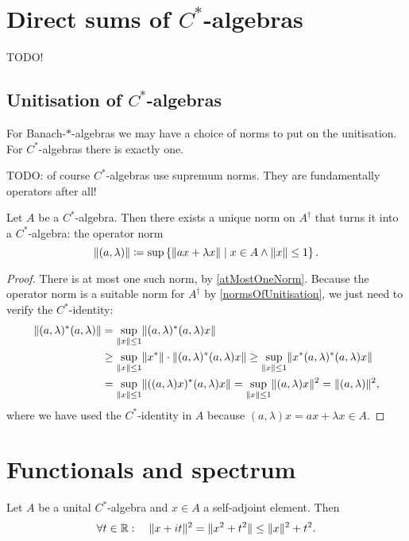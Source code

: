 \section{Direct sums of $C^*$-algebras}
TODO!

\subsection{Unitisation of $C^*$-algebras}
For Banach-$*$-algebras we may have a choice of norms to put on the unitisation. For $C^*$-algebras there is exactly one.

TODO: of course $C^*$-algebras use supremum norms. They are fundamentally operators after all!
\begin{proposition}
Let $A$ be a $C^*$-algebra. Then there exists a unique norm on $A^\dagger$ that turns it into a $C^*$-algebra: the operator norm
\[ \lVert(a,\lambda)\rVert \coloneqq \sup\left\{ \lVert ax + \lambda x\rVert \;\middle|\; x\in A \land \lVert x\rVert\leq 1 \right\} .\]
\end{proposition}
\begin{proof}
There is at most one such norm, by \ref{atMostOneNorm}. Because the operator norm is a suitable norm for $A^\dagger$ by \ref{normsOfUnitisation}, we just need to verify the $C^*$-identity:
\begin{align*}
\lVert(a,\lambda)^*(a,\lambda)\rVert &= \sup_{\lVert x\rVert\leq 1} \lVert(a,\lambda)^*(a,\lambda)x\rVert \\
&\geq \sup_{\lVert x\rVert\leq 1} \lVert x^*\rVert\cdot\lVert(a,\lambda)^*(a,\lambda)x\rVert \geq \sup_{\lVert x\rVert\leq 1} \lVert x^*(a,\lambda)^*(a,\lambda)x\rVert \\
&= \sup_{\lVert x\rVert\leq 1} \lVert((a,\lambda)x)^*(a,\lambda)x\rVert = \sup_{\lVert x\rVert\leq 1} \lVert(a,\lambda)x\rVert^2 = \lVert(a,\lambda)\rVert^2,
\end{align*}
where we have used the $C^*$-identity in $A$ because $(a,\lambda)x = ax + \lambda x \in A$.
\end{proof}

\section{Functionals and spectrum}
\begin{lemma} \label{normSelfAdjoint}
Let $A$ be a unital $C^*$-algebra and $x\in A$ a self-adjoint element. Then
\[ \forall t\in\mathbb{R}: \quad \lVert x+it\rVert^2 = \lVert x^2+t^2\rVert \leq \lVert x\rVert^2 + t^2. \]
\end{lemma}

